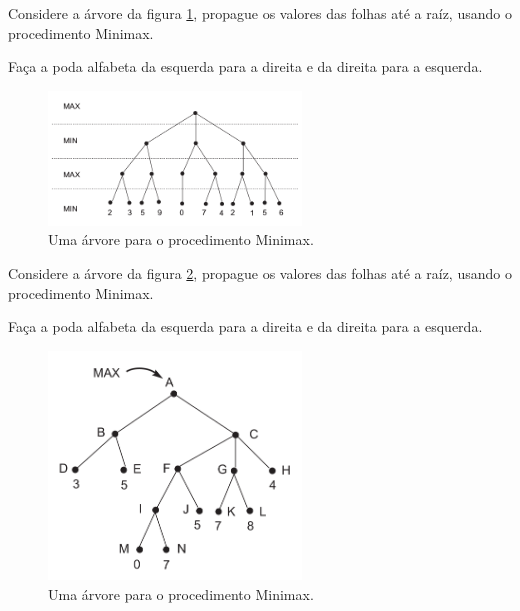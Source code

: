 \documentclass[12pt]{exam}
\begin{document}
\vspace{3em}

\begin{questions}

\item Considere a árvore da figura \ref{fig:treeGameMinMax01}, propague os valores das folhas até a raíz, usando o procedimento Minimax.

Faça a poda alfabeta da esquerda para a direita e da direita para a esquerda.

\begin{figure}[h]
    \centering
    \includegraphics[width=0.60\textwidth]{treeGameMinMax01}
    \caption{Uma árvore para o procedimento Minimax.}
    \label{fig:treeGameMinMax01}
\end{figure}




\break


\item Considere a árvore da figura \ref{fig:treeGameMinMax02}, propague os valores das folhas até a raíz, usando o procedimento Minimax.

Faça a poda alfabeta da esquerda para a direita e da direita para a esquerda.

\begin{figure}[h]
    \centering
    \includegraphics[width=0.60\textwidth]{treeGameMinMax02}
    \caption{Uma árvore para o procedimento Minimax.}
    \label{fig:treeGameMinMax02}
\end{figure}


\end{questions}
\end{document}
